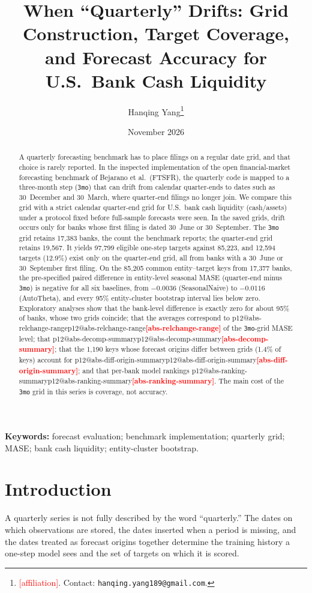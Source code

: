 \documentclass[11pt]{article}
\title{When ``Quarterly'' Drifts: Grid Construction, Target Coverage,\\ and Forecast Accuracy for U.S.\ Bank Cash Liquidity}
\author{Hanqing Yang\thanks{\textcolor{red}{[affiliation]}. Contact: \texttt{hanqing.yang189@gmail.com}.}}
\date{November 2026}
\makeatletter
\newcommand{\val}[1]{\ifcsname p12@#1\endcsname\csname p12@#1\endcsname\else\textcolor{red}{\textbf{[#1]}}\fi}
\makeatother
\begin{document}
\maketitle

\begin{abstract}
A quarterly forecasting benchmark has to place filings on a regular date grid, and that choice is rarely reported. In the inspected implementation of the open financial-market forecasting benchmark of Bejarano et al.\ (FTSFR), the quarterly code is mapped to a three-month step (\texttt{3mo}) that can drift from calendar quarter-ends to dates such as 30~December and 30~March, where quarter-end filings no longer join. We compare this grid with a strict calendar quarter-end grid for U.S.\ bank cash liquidity (cash/assets) under a protocol fixed before full-sample forecasts were seen. In the saved grids, drift occurs only for banks whose first filing is dated 30~June or 30~September. The \texttt{3mo} grid retains 17,383 banks, the count the benchmark reports; the quarter-end grid retains 19,567. It yields 97,799 eligible one-step targets against 85,223, and 12,594 targets (12.9\%) exist only on the quarter-end grid, all from banks with a 30~June or 30~September first filing. On the 85,205 common entity--target keys from 17,377 banks, the pre-specified paired difference in entity-level seasonal MASE (quarter-end minus \texttt{3mo}) is negative for all six baselines, from $-0.0036$ (SeasonalNaive) to $-0.0116$ (AutoTheta), and every 95\% entity-cluster bootstrap interval lies below zero. Exploratory analyses show that the bank-level difference is exactly zero for about 95\% of banks, whose two grids coincide; that the averages correspond to \val{abs-relchange-range} of the \texttt{3mo}-grid MASE level; that \val{abs-decomp-summary}; that the 1,190 keys whose forecast origins differ between grids (1.4\% of keys) account for \val{abs-diff-origin-summary}; and that per-bank model rankings \val{abs-ranking-summary}. The main cost of the \texttt{3mo} grid in this series is coverage, not accuracy.
\end{abstract}

\noindent\textbf{Keywords:} forecast evaluation; benchmark implementation; quarterly grid; MASE; bank cash liquidity; entity-cluster bootstrap.

\section{Introduction}
A quarterly series is not fully described by the word ``quarterly.'' The dates on which observations are stored, the dates inserted when a period is missing, and the dates treated as forecast origins together determine the training history a one-step model sees and the set of targets on which it is scored.
\end{document}
